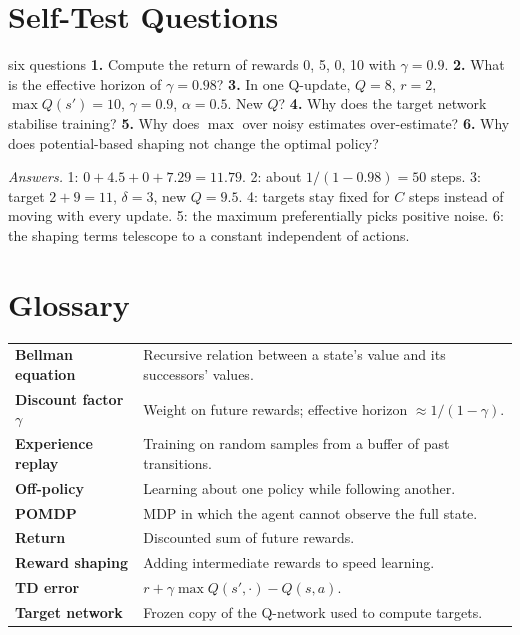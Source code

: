 \documentclass[11pt]{article}
\begin{document}
\section{Self-Test Questions}
\begin{question}{six questions}
\textbf{1.} Compute the return of rewards 0, 5, 0, 10 with $\gamma=0.9$. \textbf{2.} What is the effective horizon of $\gamma=0.98$? \textbf{3.} In one Q-update, $Q=8$, $r=2$, $\max Q(s')=10$, $\gamma=0.9$, $\alpha=0.5$. New $Q$? \textbf{4.} Why does the target network stabilise training? \textbf{5.} Why does $\max$ over noisy estimates over-estimate? \textbf{6.} Why does potential-based shaping not change the optimal policy?

\textit{Answers.} 1: $0+4.5+0+7.29=11.79$. 2: about $1/(1-0.98)=50$ steps. 3: target $2+9=11$, $\delta=3$, new $Q=9.5$. 4: targets stay fixed for $C$ steps instead of moving with every update. 5: the maximum preferentially picks positive noise. 6: the shaping terms telescope to a constant independent of actions.
\end{question}

\section{Glossary}
\begin{center}\small\renewcommand{\arraystretch}{1.2}
\begin{tabularx}{\textwidth}{>{\bfseries}p{3.3cm}X}\toprule
Bellman equation & Recursive relation between a state's value and its successors' values.\\
Discount factor $\gamma$ & Weight on future rewards; effective horizon $\approx1/(1-\gamma)$.\\
Experience replay & Training on random samples from a buffer of past transitions.\\
Off-policy & Learning about one policy while following another.\\
POMDP & MDP in which the agent cannot observe the full state.\\
Return & Discounted sum of future rewards.\\
Reward shaping & Adding intermediate rewards to speed learning.\\
TD error & $r+\gamma\max Q(s',\cdot)-Q(s,a)$.\\
Target network & Frozen copy of the Q-network used to compute targets.\\\bottomrule
\end{tabularx}\end{center}
\end{document}
